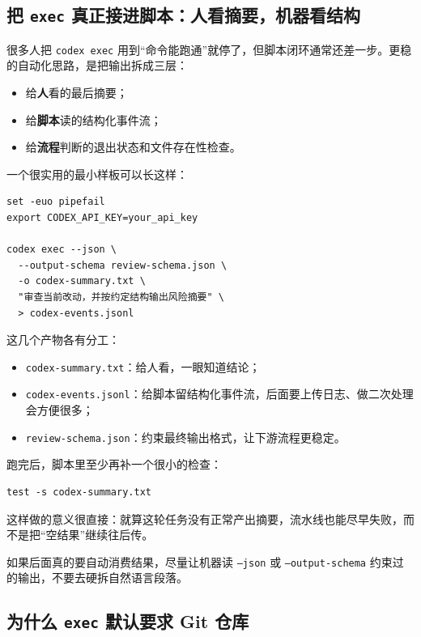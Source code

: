 \documentclass[UTF8,a4paper,12pt]{ctexart}
\begin{document}
\subsection{把 \texttt{exec} 真正接进脚本：人看摘要，机器看结构}

很多人把 \texttt{codex exec} 用到“命令能跑通”就停了，但脚本闭环通常还差一步。更稳的自动化思路，是把输出拆成三层：
\begin{itemize}
  \item 给\textbf{人}看的最后摘要；
  \item 给\textbf{脚本}读的结构化事件流；
  \item 给\textbf{流程}判断的退出状态和文件存在性检查。
\end{itemize}

一个很实用的最小样板可以长这样：

\begin{lstlisting}[style=cli]
set -euo pipefail
export CODEX_API_KEY=your_api_key

codex exec --json \
  --output-schema review-schema.json \
  -o codex-summary.txt \
  "审查当前改动，并按约定结构输出风险摘要" \
  > codex-events.jsonl
\end{lstlisting}

这几个产物各有分工：
\begin{itemize}
  \item \texttt{codex-summary.txt}：给人看，一眼知道结论；
  \item \texttt{codex-events.jsonl}：给脚本留结构化事件流，后面要上传日志、做二次处理会方便很多；
  \item \texttt{review-schema.json}：约束最终输出格式，让下游流程更稳定。
\end{itemize}

跑完后，脚本里至少再补一个很小的检查：

\begin{lstlisting}[style=cli]
test -s codex-summary.txt
\end{lstlisting}

这样做的意义很直接：就算这轮任务没有正常产出摘要，流水线也能尽早失败，而不是把“空结果”继续往后传。

\begin{tipbox}
如果后面真的要自动消费结果，尽量让机器读 \texttt{--json} 或 \texttt{--output-schema} 约束过的输出，不要去硬拆自然语言段落。
\end{tipbox}

\subsection{为什么 \texttt{exec} 默认要求 Git 仓库}
\end{document}
